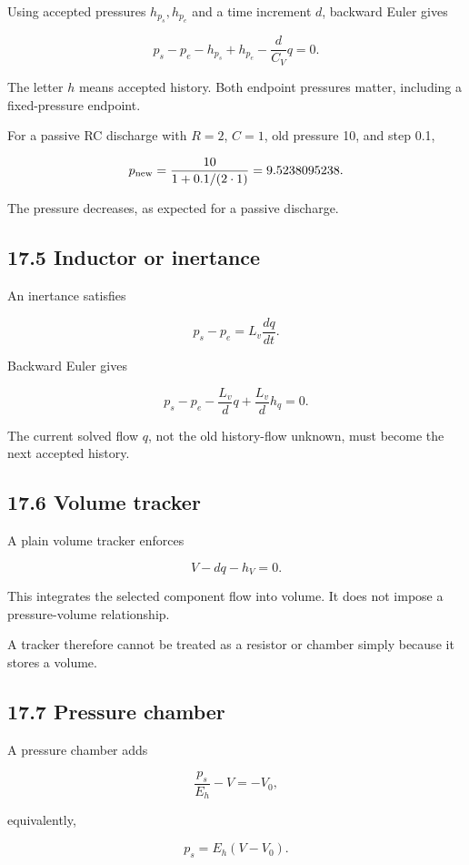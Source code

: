 \documentclass[11pt,a4paper]{article}
\begin{document}
Using accepted pressures \(h_{p_s},h_{p_e}\) and a time increment \(d\), backward Euler gives


\begingroup\small
\[
p_s-p_e-h_{p_s}+h_{p_e}-\frac d{C_V}q=0.
\]
\endgroup


The letter \(h\) means accepted history. Both endpoint pressures matter, including a fixed-pressure endpoint.

For a passive RC discharge with \(R=2\), \(C=1\), old pressure 10, and step 0.1,


\begingroup\small
\[
p_{\rm new}=\frac{10}{1+0.1/(2\cdot1)}
=9.5238095238.
\]
\endgroup


The pressure decreases, as expected for a passive discharge.

\subsection{17.5 Inductor or inertance}
An inertance satisfies


\begingroup\small
\[
p_s-p_e=L_v\frac{dq}{dt}.
\]
\endgroup


Backward Euler gives


\begingroup\small
\[
p_s-p_e-\frac{L_v}{d}q
+\frac{L_v}{d}h_q=0.
\]
\endgroup


The current solved flow \(q\), not the old history-flow unknown, must become the next accepted history.

\subsection{17.6 Volume tracker}
A plain volume tracker enforces


\begingroup\small
\[
V-dq-h_V=0.
\]
\endgroup


This integrates the selected component flow into volume. It does not impose a pressure-volume relationship.

A tracker therefore cannot be treated as a resistor or chamber simply because it stores a volume.

\subsection{17.7 Pressure chamber}
A pressure chamber adds


\begingroup\small
\[
\frac{p_s}{E_h}-V=-V_0,
\]
\endgroup


equivalently,


\begingroup\small
\[
p_s=E_h(V-V_0).
\]
\endgroup
\end{document}
